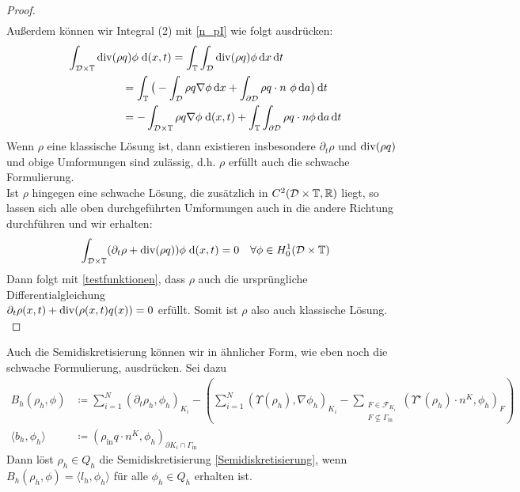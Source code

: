 \begin{proof}
\begin{align*}
	\end{align*}
	Außerdem können wir Integral (2) mit  \ref{n_pI} wie folgt ausdrücken:
	\begin{align*}
	\int_{\mathcal{D} \times \mathbb{T}}  
	\operatorname{div}(\rho &q ) \phi\; \mathrm{d} (x,t) = \int_{\mathbb{T}} \int_{\mathcal{D}} \operatorname{div}(\rho q ) \phi \, \mathrm{d} x \, \mathrm{d} t \\
	&= \int_{\mathbb{T}} \big( - \int_{\mathcal{D}} \rho q \nabla \phi \, \mathrm{d} x + \int_{\partial \mathcal{D}} \rho q \cdot n \ \phi \, \mathrm{d} a \big)  \, \mathrm{d} t \\
	&= - \int_{\mathcal{D} \times \mathbb{T}} \rho q \nabla \phi \; \mathrm{d} (x,t) + \int_{\mathbb{T}} \int_{\partial \mathcal{D}} \rho q \cdot n \phi \, \mathrm{d} a \, \mathrm{d} t 
	\end{align*}
	Wenn $ \rho  $ eine klassische Lösung ist, dann existieren insbesondere $ \partial_t \rho  $ und $ \operatorname{div}(\rho q) $ und obige Umformungen sind zulässig, d.h. $ \rho $ erfüllt auch die schwache Formulierung. \\
	Ist $ \rho $ hingegen eine schwache Lösung, die zusätzlich in $ C^2(\mathcal{D}\times\mathbb{T},\mathbb{R}) $ liegt, so lassen sich alle oben durchgeführten Umformungen auch in die andere Richtung durchführen und wir erhalten: 
	\[
	\int_{\mathcal{D}\times\mathbb{T}} (\partial_t\rho + \operatorname{div}(\rho q))\phi \; \mathrm{d} (x,t) = 0 \quad \forall \phi \in H_0^1(\mathcal{D}\times\mathbb{T}) 
	\] 
	Dann folgt mit \eqref{testfunktionen}, dass $ \rho $ auch die ursprüngliche Differentialgleichung\\
	$ \partial_t \rho(x,t) + \operatorname{div}(\rho(x,t) q(x)) = 0  $ erfüllt. Somit ist $ \rho $ also auch klassische Lösung.\\
	
\end{proof}

Auch die Semidiskretisierung können wir in ähnlicher Form, wie eben noch die schwache Formulierung, ausdrücken. Sei dazu
\begin{align*}
B_h(\rho_h,\phi) &\coloneqq \sum_{i=1}^{N} (\partial_t\rho_{h},\phi_h)_{K_i}  - \left( \sum_{i=1}^{N} (\Upsilon(\rho_h),\nabla \phi_h)_{K_i} - \sum_{\substack{F \in \mathcal{F}_{K_i} \\ F \not\subseteq \Gamma_{\text{in}}}} (\Upsilon^{\star}(\rho_h)\cdot n^K,\phi_h)_F\right) \\
\langle b_h , \phi_h \rangle &\coloneqq (\rho_{\text{in}}q \cdot n^K,\phi_h)_{\partial K_i \cap \Gamma_{\text{in}}}
\end{align*}
Dann löst $ \rho_h \in Q_h $ die Semidiskretisierung \eqref{Semidiskretisierung}, wenn $ B_h(\rho_{h},\phi) = \langle l_h,\phi_h \rangle  $ für alle $ \phi_h \in Q_h$ erhalten ist.



